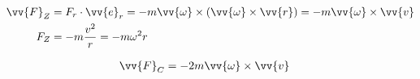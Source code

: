 \begin{boxleft}
\end{boxleft}\begin{boxrightshaded}
\begin{align*}
\vv{F}_Z&=F_r\cdot \vv{e}_r=-m\vv{\omega}\times\left(\vv{\omega}\times\vv{r}\right)=-m\vv{\omega}\times\vv{v}\\
  F_Z&=-m\frac{v^2}{r}=-m\omega^2 r
\end{align*}
\end{boxrightshaded}

\begin{boxleft}
\end{boxleft}\begin{boxrightshaded}
\begin{align*}
\vv{F}_C&=-2m\vv{\omega}\times\vv{v}
\end{align*}
\end{boxrightshaded}
